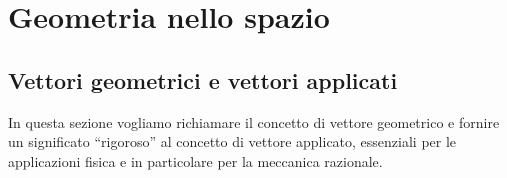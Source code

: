 
\newcommand{\bR}[1]{\mathbb{R}^{#1}}
\newcommand{\bS}[1]{\mathbb{S}^{#1}}
\newcommand{\bA}[1]{\mathbb{A}^{#1}} 
\newcommand{\bE}[1]{\mathbb{E}^{#1}}

\newtheorem*{NB}{\textbf{N.B}}

\newtheorem*{sol}{\textbf{Sol}}

\newtheorem{exercise}{\textbf{Esercizio}}

\newenvironment{soluz}
{\begin{sol}}{\begin{flushright}$\star$\end{flushright}\end{sol}}

\chapter{Geometria nello spazio}


% 

\section{Vettori geometrici e vettori applicati}
\label{sec:3D_vettori}

In questa sezione vogliamo richiamare il concetto di vettore geometrico e 
fornire un significato ``rigoroso'' al concetto di vettore applicato, essenziali 
per le applicazioni fisica e in particolare per la meccanica razionale. 

